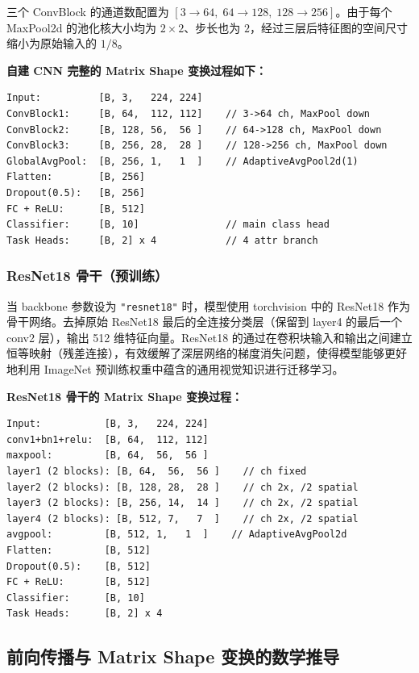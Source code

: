 \documentclass[11pt,a4paper]{ctexart}
\begin{document}
三个 ConvBlock 的通道数配置为 $[3\rightarrow64,\; 64\rightarrow128,\; 128\rightarrow256]$。由于每个 MaxPool2d 的池化核大小均为 $2\times2$、步长也为 $2$，经过三层后特征图的空间尺寸缩小为原始输入的 $1/8$。

\vspace{4pt}
\textbf{自建 CNN 完整的 Matrix Shape 变换过程如下：}
\begin{lstlisting}
Input:          [B, 3,   224, 224]
ConvBlock1:     [B, 64,  112, 112]    // 3->64 ch, MaxPool down
ConvBlock2:     [B, 128, 56,  56 ]    // 64->128 ch, MaxPool down
ConvBlock3:     [B, 256, 28,  28 ]    // 128->256 ch, MaxPool down
GlobalAvgPool:  [B, 256, 1,   1  ]    // AdaptiveAvgPool2d(1)
Flatten:        [B, 256]
Dropout(0.5):   [B, 256]
FC + ReLU:      [B, 512]
Classifier:     [B, 10]               // main class head
Task Heads:     [B, 2] x 4            // 4 attr branch
\end{lstlisting}

\subsubsection{ResNet18 骨干（预训练）}

当 backbone 参数设为 \texttt{"resnet18"} 时，模型使用 torchvision 中的 ResNet18 作为骨干网络。去掉原始 ResNet18 最后的全连接分类层（保留到 layer4 的最后一个 conv2 层），输出 512 维特征向量。ResNet18 的通过在卷积块输入和输出之间建立恒等映射（残差连接），有效缓解了深层网络的梯度消失问题，使得模型能够更好地利用 ImageNet 预训练权重中蕴含的通用视觉知识进行迁移学习。

\vspace{4pt}
\textbf{ResNet18 骨干的 Matrix Shape 变换过程：}
\begin{lstlisting}
Input:           [B, 3,   224, 224]
conv1+bn1+relu:  [B, 64,  112, 112]
maxpool:         [B, 64,  56,  56 ]
layer1 (2 blocks): [B, 64,  56,  56 ]    // ch fixed
layer2 (2 blocks): [B, 128, 28,  28 ]    // ch 2x, /2 spatial
layer3 (2 blocks): [B, 256, 14,  14 ]    // ch 2x, /2 spatial
layer4 (2 blocks): [B, 512, 7,   7  ]    // ch 2x, /2 spatial
avgpool:         [B, 512, 1,   1  ]    // AdaptiveAvgPool2d
Flatten:         [B, 512]
Dropout(0.5):    [B, 512]
FC + ReLU:       [B, 512]
Classifier:      [B, 10]
Task Heads:      [B, 2] x 4
\end{lstlisting}

\subsection{前向传播与 Matrix Shape 变换的数学推导}
\end{document}
